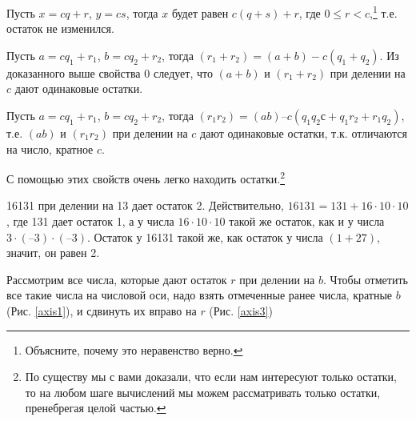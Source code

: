 \begin{dok}
Пусть $x = cq + r$, $y  = cs$, тогда $x$ будет равен $c(q + s) + r$, где $0 \leqslant r < c$,\footnote{Объясните, почему это неравенство верно.} т.е. остаток не изменился.
\end{dok}


\begin{dok}
Пусть $a = cq_1 + r_1$, $b = cq_2 + r_2$, тогда $(r_1 + r_2) = (a + b) - c(q_1 + q_2)$. Из доказанного выше свойства $0$ следует, что $(a + b)$ и $(r_1 + r_2)$ при делении на $c$ дают одинаковые остатки. 
\end{dok}


\begin{dok}
Пусть $a = cq_1 + r_1$, $b = cq_2 + r_2$, тогда $(r_1r_2) = (ab) – c(q_1q_2с + q_1r_2 + r_1q_2)$, т.е. $(ab)$ и $(r_1r_2)$ при делении на $c$ дают одинаковые остатки, т.к. отличаются на число, кратное $c$.
\end{dok}

С помощью этих свойств очень легко находить остатки.\footnote{По существу мы с вами доказали, что если нам интересуют только остатки, то на любом шаге вычислений мы можем рассматривать только остатки, пренебрегая целой частью.}

\begin{samp}
16131 при делении на 13 дает остаток 2. Действительно,   $16131 = 131 + 16\cdot10\cdot10$,    где 131 дает остаток 1,  а у числа $16\cdot10\cdot10$ такой же остаток, как и у числа  $3\cdot(–3)\cdot(–3)$. Остаток у 16131 такой же, как остаток у числа $(1+27)$, значит, он равен 2.
\end{samp}

Рассмотрим все числа, которые дают остаток $r$ при делении на $b$. Чтобы отметить все такие числа на числовой оси, надо взять отмеченные ранее числа, кратные $b$ (Рис. \ref{axis1}), и сдвинуть их вправо на $r$ (Рис. \ref{axis3})

